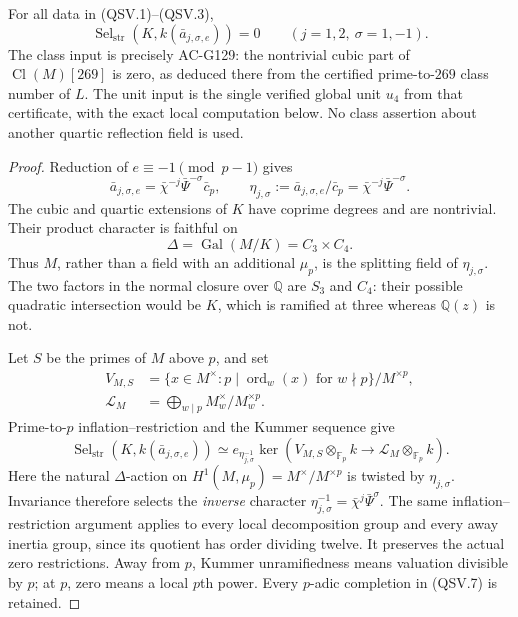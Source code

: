 \begin{theorem}
\label{thm:ACG130residual}
For all data in (QSV.1)--(QSV.3),
\[
       \operatorname{Sel}_{\mathrm{str}}
                (K,k(\bar a_{j,\sigma,e}))=0
             \qquad(j=1,2,\ \sigma=1,-1).
 \tag{QSV.4}
\]
The class input is precisely AC-G129: the nontrivial cubic part of
\(\operatorname{Cl}(M)[269]\) is zero, as deduced there from the
certified prime-to-\(269\) class number of \(L\).
The unit input is the single verified global unit \(u_4\) from that
certificate, with the exact local computation below.
No class assertion about another quartic reflection field is used.
\end{theorem}

\begin{proof}
Reduction of \(e\equiv-1\pmod{p-1}\) gives
\[
 \bar a_{j,\sigma,e}=\bar\chi^{-j}\bar\Psi^{-\sigma}\bar c_p,
 \qquad
 \eta_{j,\sigma}:=\bar a_{j,\sigma,e}/\bar c_p
                  =\bar\chi^{-j}\bar\Psi^{-\sigma}.
 \tag{QSV.5}
\]
The cubic and quartic extensions of \(K\) have coprime degrees and
are nontrivial.  Their product character is faithful on
\[
       \Delta=\operatorname{Gal}(M/K)=C_3\times C_4.
 \tag{QSV.6}
\]
Thus \(M\), rather than a field with an additional \(\mu_p\), is
the splitting field of \(\eta_{j,\sigma}\).
The two factors in the normal closure over \(\mathbb Q\) are
\(S_3\) and \(C_4\): their possible quadratic intersection would
be \(K\), which is ramified at three whereas \(\mathbb Q(z)\) is not.

Let \(S\) be the primes of \(M\) above \(p\), and set
\[
 \begin{split}
 V_{M,S}&=\{x\in M^\times:
       p\mid\operatorname{ord}_w(x)\text{ for }w\nmid p\}/M^{\times p},\\
 \mathcal L_M&=\bigoplus_{w\mid p}M_w^\times/M_w^{\times p}.
 \end{split}
 \tag{QSV.7}
\]
Prime-to-\(p\) inflation--restriction and the Kummer sequence give
\[
 \operatorname{Sel}_{\mathrm{str}}(K,k(\bar a_{j,\sigma,e}))
 \simeq
 e_{\eta_{j,\sigma}^{-1}}\ker\left(
       V_{M,S}\otimes_{\mathbb F_p}k
                \longrightarrow\mathcal L_M\otimes_{\mathbb F_p}k
                              \right).
 \tag{QSV.8}
\]
Here the natural \(\Delta\)-action on
\(H^1(M,\mu_p)=M^\times/M^{\times p}\) is twisted by
\(\eta_{j,\sigma}\).  Invariance therefore selects the
\emph{inverse} character
\(\eta_{j,\sigma}^{-1}=\bar\chi^j\bar\Psi^\sigma\).
The same inflation--restriction argument applies to every local
decomposition group and every away inertia group, since its
quotient has order dividing twelve.  It preserves the actual
zero restrictions.  Away from \(p\), Kummer unramifiedness means
valuation divisible by \(p\); at \(p\), zero means a local
\(p\)th power.  Every \(p\)-adic completion in (QSV.7) is retained.


\end{proof}
